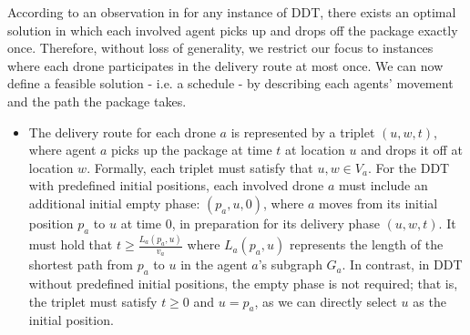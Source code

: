According to an observation in \cite{erlebach:drones} for any instance of DDT, there exists an optimal solution in which each involved agent picks up and drops off the package exactly once. Therefore, without loss of generality, we restrict our focus to instances where each drone participates in the delivery route at most once.  
We can now define a feasible solution - i.e. a schedule - by describing each agents' movement and the path the package takes. 
\begin{itemize}
\item %
The delivery route for each drone $a$ is represented by a %
triplet $(u, w, t)$, where agent $a$ picks up the package at time $t$ at location $u$ and drops it off at location $w$. Formally, each triplet must satisfy that $u, w \in V_a$.   
For the DDT with predefined initial positions, each involved drone $a$ must include an additional initial empty phase: $(p_a, u, 0)$, where $a$ moves from its initial position $p_a$ to $u$ at time $0$, in preparation for its delivery phase $(u, w, t)$. It must hold that $t\ge \frac{L_a(p_a, u)}{v_a} $ where $L_a(p_a, u)$ represents the length of the shortest path from $p_a$ to $u$ in the agent $a$'s subgraph $G_a$. 
In contrast, in DDT without predefined initial positions, 
the empty phase is not required; that is, the triplet must satisfy $t \ge 0$ and $u = p_a$, %
as we can directly select $u$ as the initial position. 


\end{itemize}
